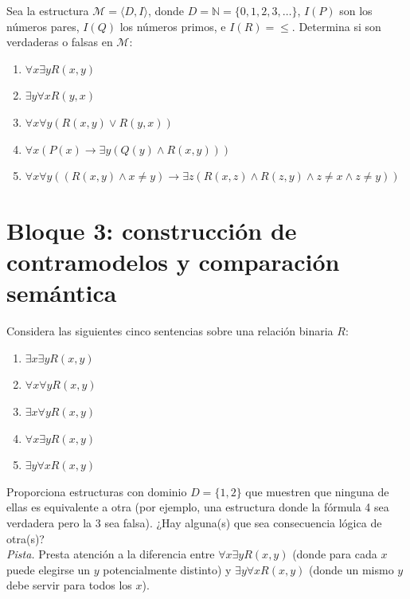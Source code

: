 \begin{pregunta}\label{e5-6}
Sea la estructura $\mathcal{M} = \langle D, I \rangle$, donde $D = \mathbb{N} = \{0, 1, 2, 3, \dots\}$, $I(P)$ son los números pares, $I(Q)$ los números primos, e $I(R) = \le$. Determina si son verdaderas o falsas en $\mathcal{M}$:
\begin{enumerate}
    \item $\forall x \exists y R(x, y)$
    \item $\exists y \forall x R(y, x)$
    \item $\forall x \forall y (R(x, y) \lor R(y, x))$
    \item $\forall x (P(x) \to \exists y (Q(y) \land R(x, y)))$
    \item $\forall x \forall y ((R(x, y) \land x \neq y) \to \exists z (R(x, z) \land R(z, y) \land z \neq x \land z \neq y))$
\end{enumerate}
\end{pregunta}

\section*{Bloque 3: construcción de contramodelos y comparación semántica}

\begin{pregunta}\label{e5-7}
Considera las siguientes cinco sentencias sobre una relación binaria $R$:
\begin{enumerate}
    \item $\exists x \exists y R(x, y)$
    \item $\forall x \forall y R(x, y)$
    \item $\exists x \forall y R(x, y)$
    \item $\forall x \exists y R(x, y)$
    \item $\exists y \forall x R(x, y)$
\end{enumerate}
Proporciona estructuras con dominio $D =
\{1, 2\}$ que muestren que ninguna de ellas es equivalente a otra (por ejemplo,
una estructura donde la fórmula 4 sea verdadera pero la 3 sea
falsa). ¿Hay alguna(s) que sea consecuencia lógica de otra(s)?\\
\textit{Pista.} Presta atención a la diferencia entre $\forall x \exists y R(x, y)$ (donde para cada $x$ puede elegirse un $y$ potencialmente distinto) y $\exists y \forall x R(x, y)$ (donde un mismo $y$ debe servir para todos los $x$).
\end{pregunta}

